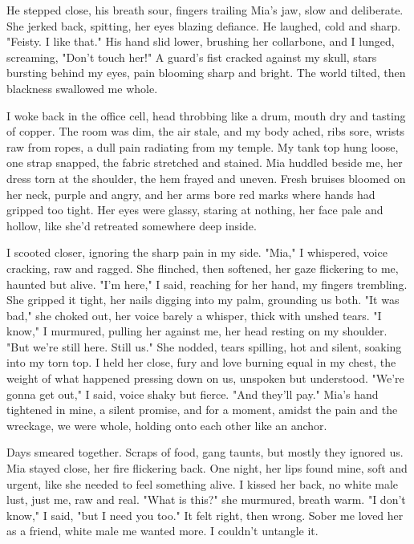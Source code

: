 \documentclass{article}
\begin{document}
He stepped close, his breath sour, fingers trailing Mia's jaw, slow and deliberate. She jerked back, spitting, her eyes blazing defiance. He laughed, cold and sharp. "Feisty. I like that." His hand slid lower, brushing her collarbone, and I lunged, screaming, "Don't touch her!" A guard's fist cracked against my skull, stars bursting behind my eyes, pain blooming sharp and bright. The world tilted, then blackness swallowed me whole.

I woke back in the office cell, head throbbing like a drum, mouth dry and tasting of copper. The room was dim, the air stale, and my body ached, ribs sore, wrists raw from ropes, a dull pain radiating from my temple. My tank top hung loose, one strap snapped, the fabric stretched and stained. Mia huddled beside me, her dress torn at the shoulder, the hem frayed and uneven. Fresh bruises bloomed on her neck, purple and angry, and her arms bore red marks where hands had gripped too tight. Her eyes were glassy, staring at nothing, her face pale and hollow, like she'd retreated somewhere deep inside.

I scooted closer, ignoring the sharp pain in my side. "Mia," I whispered, voice cracking, raw and ragged. She flinched, then softened, her gaze flickering to me, haunted but alive. "I'm here," I said, reaching for her hand, my fingers trembling. She gripped it tight, her nails digging into my palm, grounding us both. "It was bad," she choked out, her voice barely a whisper, thick with unshed tears. "I know," I murmured, pulling her against me, her head resting on my shoulder. "But we're still here. Still us." She nodded, tears spilling, hot and silent, soaking into my torn top. I held her close, fury and love burning equal in my chest, the weight of what happened pressing down on us, unspoken but understood. "We're gonna get out," I said, voice shaky but fierce. "And they'll pay." Mia's hand tightened in mine, a silent promise, and for a moment, amidst the pain and the wreckage, we were whole, holding onto each other like an anchor.

Days smeared together. Scraps of food, gang taunts, but mostly they ignored us. Mia stayed close, her fire flickering back. One night, her lips found mine, soft and urgent, like she needed to feel something alive. I kissed her back, no white male lust, just me, raw and real. "What is this?" she murmured, breath warm. "I don't know," I said, "but I need you too." It felt right, then wrong. Sober me loved her as a friend, white male me wanted more. I couldn't untangle it.
\end{document}
